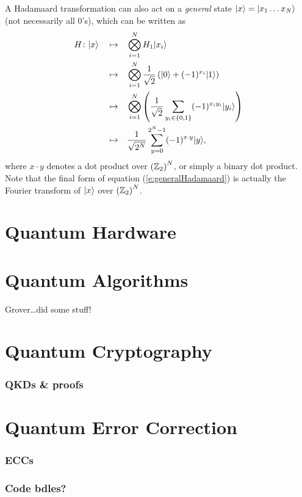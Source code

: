A Hadamaard transformation can also act on a {\sl general} state 
${|{x}\rangle}={|{x_1\ldots x_N}\rangle}$
(not necessarily all 0's), which can be written as
\begin{equation}
\begin{split}
H\colon{|{x}\rangle}\quad\mapsto\quad&
\bigotimes_{i=1}^N 
H_1{|{x_i}\rangle}\\
\quad\mapsto\quad&
\bigotimes_{i=1}^N 
\frac{1}{\sqrt{2}} \left( {|{0}\rangle} + (-1)^{x_i}{|{1}\rangle} \right)\\
\quad\mapsto\quad&
\bigotimes_{i=1}^N 
\left(\frac{1}{\sqrt{2}} \sum_{y_i\in\lbrace 0,1\rbrace} 
(-1)^{x_iy_i}{|{y_i}\rangle}\right)\\
\quad\mapsto\quad&
\frac{1}{\sqrt{2^N}} \sum_{y=0}^{2^N-1} (-1)^{x\cdot y}{|{y}\rangle},
\end{split}
\label{e:generalHadamaard}
\end{equation}
where $x\cdot y$ denotes a dot product over $\left({\mathbb{Z}}_2\right)^N$, or
simply a binary dot product.  Note that the final form of equation
(\ref{e:generalHadamaard}) is actually the Fourier transform of ${|{x}\rangle}$
over $\left({\mathbb{Z}}_2\right)^N$.


\section{Quantum Hardware}

\section{Quantum Algorithms}
\label{sec:quantCompAlgs}

Grover\cite{Grover:96}\dots did some stuff!

\section{Quantum Cryptography}

\subsubsection{QKDs \& proofs}

\section{Quantum Error Correction}

\subsubsection{ECCs}
\subsubsection{Code bdles?}
